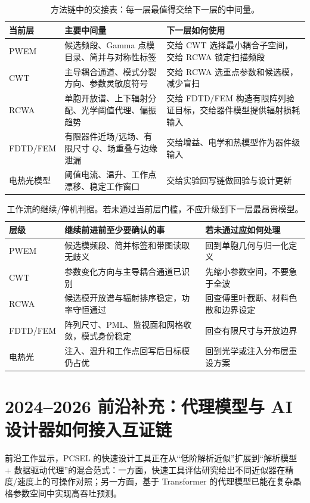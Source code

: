 \begin{table}[htbp]
  \centering
  \footnotesize
  \caption{方法链中的交接表：每一层最值得交给下一层的中间量。}
  \label{tab:method_handoff}
  \begin{tabularx}{\textwidth}{@{}p{2.1cm}p{3.1cm}Y@{}}
    \toprule
    当前层 & 主要中间量 & 下一层如何使用 \\ \midrule
    PWEM & 候选频段、Gamma 点模目录、简并与对称性标签 & 交给 CWT 选择最小耦合子空间，交给 RCWA 锁定扫描频段 \\
    CWT & 主导耦合通道、模式分裂方向、参数灵敏度符号 & 交给 RCWA 选重点参数和候选模，减少盲扫 \\
    RCWA & 单胞开放谱、上下辐射分配、光学阈值代理、偏振趋势 & 交给 FDTD/FEM 构造有限阵列验证目标，交给器件模型提供辐射损耗输入 \\
    FDTD/FEM & 有限器件近场/远场、有限尺寸 $Q$、场重叠与边缘泄漏 & 交给增益、电学和热模型作为器件级输入 \\
    电热光模型 & 阈值电流、温升、工作点漂移、稳定工作窗口 & 交给实验回写链做回验与设计更新 \\
    \bottomrule
  \end{tabularx}
\end{table}

\begin{table}[htbp]
  \centering
  \footnotesize
  \caption{工作流的继续/停机判据。若未通过当前层门槛，不应升级到下一层最昂贵模型。}
  \label{tab:workflow_go_nogo}
  \begin{tabularx}{\textwidth}{@{}p{1.9cm}p{3.0cm}Y@{}}
    \toprule
    层级 & 继续前进前至少要确认的事 & 若未通过应如何处理 \\ \midrule
    PWEM & 候选模频段、简并标签和带图读取无歧义 & 回到单胞几何与归一化定义 \\
    CWT & 参数变化方向与主导耦合通道已识别 & 先缩小参数空间，不要急于全波 \\
    RCWA & 候选模开放谱与辐射排序稳定，功率守恒通过 & 回查傅里叶截断、材料色散和边界设定 \\
    FDTD/FEM & 阵列尺寸、PML、监视面和网格收敛，模式身份稳定 & 回查有限尺寸与开放边界 \\
    电热光 & 注入、温升和工作点回写后目标模仍占优 & 回到光学或注入分布层重设方案 \\
    \bottomrule
  \end{tabularx}
\end{table}

\section{2024--2026 前沿补充：代理模型与 AI 设计器如何接入互证链}
前沿工作显示，PCSEL 的快速设计工具正在从“低阶解析近似”扩展到“解析模型 + 数据驱动代理”的混合范式：一方面，快速工具评估研究给出不同近似器在精度/速度上的可操作对照\cite{lang2025rapidpcseltools}；另一方面，基于 Transformer 的代理模型已能在复杂晶格参数空间中实现高吞吐预测\cite{qi2025postsurrogate}。

